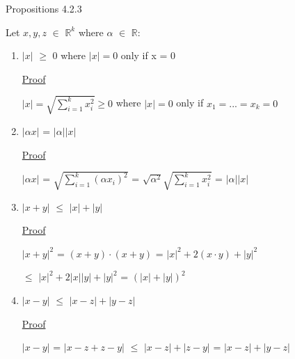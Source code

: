 \newpage

{ \color{blue} Propositions 4.2.3 } 

	\qquad Let $x,y,z$ $\in$ $\mathbb{R}^k$ where $\alpha$ $\in$ $\mathbb{R}$:
	\begin{enumerate}[label=(\alph*), leftmargin=2cm, itemsep=0.1cm]
		\item $|x|$ $\geq$ 0 where $|x| = 0$ only if x = 0

			{ \color{magenta} \underline{Proof} } 
		
				$|x| = \sqrt{\sum_{i=1}^{k} x_i^2} \geq 0$ where $|x| = 0$ only if $x_1 = ... = x_k = 0$ 

		\item $|\alpha x|$ = $|\alpha| |x|$

			{ \color{magenta} \underline{Proof} } 
		
				$|\alpha x|$ = $\sqrt{\sum_{i=1}^k (\alpha x_i)^2}$
				= $\sqrt{\alpha^2} \sqrt{\sum_{i=1}^k x_i^2}$ = $|\alpha| |x|$
	
		\item $|x+y|$ $\leq$ $|x| + |y|$

			{ \color{magenta} \underline{Proof} } 
		
				$|x+y|^2$ = $(x+y) \cdot (x+y)$ = $|x|^2 + 2(x \cdot y) + |y|^2$

				$\leq$ $|x|^2 + 2|x||y| + |y|^2$ = $(|x|+|y|)^2$

		\item $|x-y|$ $\leq$ $|x-z| + |y-z|$

			{ \color{magenta} \underline{Proof} } 
		
				$|x-y|$ = $|x-z + z-y|$ $\leq$ $|x-z| + |z-y|$ = $|x-z| + |y-z|$
	\end{enumerate}

